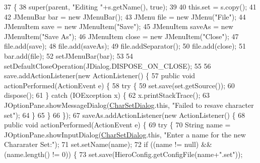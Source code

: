 \begin{DoxyCode}
37                                                   \{
38         super(parent, \textcolor{stringliteral}{"Editing "}+s.getName(), \textcolor{keyword}{true});
39     
40         this.\textcolor{keyword}{set} = s.copy(); 
41         
42         JMenuBar bar = \textcolor{keyword}{new} JMenuBar();
43         JMenu file = \textcolor{keyword}{new} JMenu(\textcolor{stringliteral}{"File"});
44         JMenuItem save = \textcolor{keyword}{new} JMenuItem(\textcolor{stringliteral}{"Save"});
45         JMenuItem saveAs = \textcolor{keyword}{new} JMenuItem(\textcolor{stringliteral}{"Save As"});
46         JMenuItem close = \textcolor{keyword}{new} JMenuItem(\textcolor{stringliteral}{"Close"});
47         file.add(save);
48         file.add(saveAs);
49         file.addSeparator();
50         file.add(close);
51         bar.add(file);
52         setJMenuBar(bar);
53         
54         setDefaultCloseOperation(JDialog.DISPOSE\_ON\_CLOSE);
55         
56         save.addActionListener(\textcolor{keyword}{new} ActionListener() \{
57             \textcolor{keyword}{public} \textcolor{keywordtype}{void} actionPerformed(ActionEvent e) \{
58                 \textcolor{keywordflow}{try} \{
59                     \textcolor{keyword}{set}.save(\textcolor{keyword}{set}.getSource());
60                     dispose();
61                 \} \textcolor{keywordflow}{catch} (IOException x) \{
62                     x.printStackTrace();
63                     JOptionPane.showMessageDialog(\mbox{\hyperlink{classorg_1_1newdawn_1_1slick_1_1tools_1_1hiero_1_1_char_set_dialog_ad98e518276c347b0735f423346969033}{CharSetDialog}}.this, \textcolor{stringliteral}{"Failed to resave
       character set"});
64                 \}
65             \}
66         \});
67         saveAs.addActionListener(\textcolor{keyword}{new} ActionListener() \{
68             \textcolor{keyword}{public} \textcolor{keywordtype}{void} actionPerformed(ActionEvent e) \{
69                 \textcolor{keywordflow}{try} \{
70                     String name = JOptionPane.showInputDialog(\mbox{\hyperlink{classorg_1_1newdawn_1_1slick_1_1tools_1_1hiero_1_1_char_set_dialog_ad98e518276c347b0735f423346969033}{CharSetDialog}}.this, \textcolor{stringliteral}{"Enter a
       name for the new Chararater Set:"});
71                     \textcolor{keyword}{set}.setName(name);
72                     \textcolor{keywordflow}{if} ((name != null) && (name.length() != 0)) \{
73                         \textcolor{keyword}{set}.save(HieroConfig.getConfigFile(name+\textcolor{stringliteral}{".set"}));

\end{DoxyCode}
